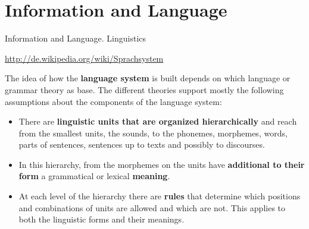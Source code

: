 \documentclass{beamer}
\begin{document}
\section{Information and Language}


\begin{frame}{Information and Language. Linguistics}\small
  
\url{http://de.wikipedia.org/wiki/Sprachsystem}

The idea of how the \textbf{language system} is built depends on which
language or grammar theory as base. The different theories support mostly the
following assumptions about the components of the language system:
\begin{itemize}
\item There are \textbf{linguistic units that are organized hierarchically}
  and reach from the smallest units, the sounds, to the phonemes, morphemes,
  words, parts of sentences, sentences up to texts and possibly to discourses.
\item In this hierarchy, from the morphemes on the units have
  \textbf{additional to their form} a grammatical or lexical \textbf{meaning}.
\item At each level of the hierarchy there are \textbf{rules} that determine
  which positions and combinations of units are allowed and which are not.
  This applies to both the linguistic forms and their meanings.
\end{itemize}
\end{frame}
\end{document}
